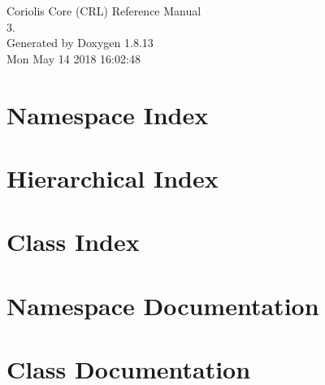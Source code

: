 \documentclass[a4paper]{socbook}
\begin{document}
   \begin{titlepage}
     \vspace*{7cm}
     \begin{center}
     {\Large Coriolis Core (\+C\+R\+L) Reference Manual\\[1ex]\large 3. }\\
     \vspace*{1cm}
     {\large Generated by Doxygen 1.8.13}\\
     \vspace*{0.5cm}
     {\small Mon May 14 2018 16:02:48}\\
     \end{center}
   \end{titlepage}

   \clearemptydoublepage

   \tableofcontents
   \clearemptydoublepage

\chapter{Namespace Index}

\chapter{Hierarchical Index}

\chapter{Class Index}

\chapter{Namespace Documentation}


\chapter{Class Documentation}















\backmatter
\newpage
{}
\clearemptydoublepage
{}
\printindex
\end{document}
